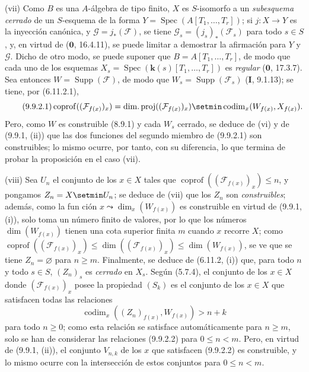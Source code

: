 (vii) Como $B$ es una $A$-álgebra de tipo finito, $X$ es $S$-isomorfo a un
\emph{subesquema cerrado} de un $S$-esquema de la forma
$Y=\operatorname{Spec}(A[T_1,\ldots,T_r])$; si $j:X\to Y$ es la inyección
canónica, y $\mathcal G=j_*(\mathcal F)$, se tiene
$\mathcal G_s=(j_s)_*(\mathcal F_s)$ para todo $s\in S$, y, en virtud de
($\mathbf 0$, 16.4.11), se puede limitar a demostrar la afirmación para $Y$ y
$\mathcal G$. Dicho de otro modo, se puede suponer que $B=A[T_1,\ldots,T_r]$, de
modo que cada uno de los esquemas $X_s=\operatorname{Spec}(\boldsymbol{k}(s)[T_1,\ldots,T_r])$
es \emph{regular} ($\mathbf 0$, 17.3.7). Sea entonces
$W=\operatorname{Supp}(\mathcal F)$, de modo que
$W_s=\operatorname{Supp}(\mathcal F_s)$ (\textbf{I}, 9.1.13); se tiene, por
(6.11.2.1),
\begin{equation}
\tag{9.9.2.1}
\label{IV.9.9.2.1-fr}
\operatorname{coprof}((\mathcal F_{f(x)})_x)=
\operatorname{dim.proj}((\mathcal F_{f(x)})_x)\setmin
\operatorname{codim}_x(W_{f(x)},X_{f(x)}).
\end{equation}
Pero, como $W$ es construible (8.9.1) y cada $W_s$ cerrado, se deduce de
(vi) y de (9.9.1, (ii)) que las dos funciones del segundo miembro de (9.9.2.1)
son construibles; lo mismo ocurre, por tanto, con su diferencia, lo que termina
de probar la proposición en el caso (vii).

(viii) Sea $U_n$ el conjunto de los $x\in X$ tales que
$\operatorname{coprof}((\mathcal F_{f(x)})_x)\leq n$, y pongamos
$Z_n=X\setmin U_n$; se deduce de (vii) que los $Z_n$ son \emph{construibles}; además,
como
la fun%
ción $x\leadsto\dim_x(W_{f(x)})$ es construible en virtud de
(9.9.1, (i)), solo toma un número finito de valores, por lo que los números
$\dim(W_{f(x)})$ tienen una cota superior finita $m$ cuando $x$ recorre $X$;
como
$\operatorname{coprof}((\mathcal F_{f(x)})_x)\leq
\dim((\mathcal F_{f(x)})_x)\leq\dim(W_{f(x)})$, se ve que se tiene
$Z_n=\varnothing$ para $n\geq m$. Finalmente, se deduce de (6.11.2, (i)) que, para
todo $n$ y todo $s\in S$, $(Z_n)_s$ es \emph{cerrado} en $X_s$. Según
(5.7.4), el conjunto de los $x\in X$ donde $(\mathcal F_{f(x)})_x$ posee la
propiedad $(S_k)$ es el conjunto de los $x\in X$ que satisfacen todas las relaciones
\begin{equation}
\tag{9.9.2.2}
\label{IV.9.9.2.2-fr}
\operatorname{codim}_x((Z_n)_{f(x)},W_{f(x)})>n+k
\end{equation}
para todo $n\geq0$; como esta relación se satisface automáticamente para
$n\geq m$, solo se han de considerar las relaciones (9.9.2.2) para $0\leq n<m$.
Pero, en virtud de (9.9.1, (ii)), el conjunto $V_{n,k}$ de los $x$ que satisfacen (9.9.2.2)
es construible, y lo mismo ocurre con la intersección de estos conjuntos para
$0\leq n<m$.

